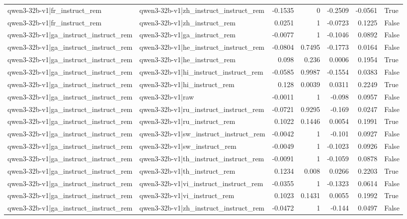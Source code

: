 \begin{table}
\begin{tabular}{l l r r r r l}
qwen3-32b-v1|fr_instruct_rem & qwen3-32b-v1|zh_instruct_instruct_rem & -0.1535 & 0 & -0.2509 & -0.0561 & True \\
qwen3-32b-v1|fr_instruct_rem & qwen3-32b-v1|zh_instruct_rem & 0.0251 & 1 & -0.0723 & 0.1225 & False \\
qwen3-32b-v1|ga_instruct_instruct_rem & qwen3-32b-v1|ga_instruct_rem & -0.0077 & 1 & -0.1046 & 0.0892 & False \\
qwen3-32b-v1|ga_instruct_instruct_rem & qwen3-32b-v1|he_instruct_instruct_rem & -0.0804 & 0.7495 & -0.1773 & 0.0164 & False \\
qwen3-32b-v1|ga_instruct_instruct_rem & qwen3-32b-v1|he_instruct_rem & 0.098 & 0.236 & 0.0006 & 0.1954 & True \\
qwen3-32b-v1|ga_instruct_instruct_rem & qwen3-32b-v1|hi_instruct_instruct_rem & -0.0585 & 0.9987 & -0.1554 & 0.0383 & False \\
qwen3-32b-v1|ga_instruct_instruct_rem & qwen3-32b-v1|hi_instruct_rem & 0.128 & 0.0039 & 0.0311 & 0.2249 & True \\
qwen3-32b-v1|ga_instruct_instruct_rem & qwen3-32b-v1|raw & -0.0011 & 1 & -0.098 & 0.0957 & False \\
qwen3-32b-v1|ga_instruct_instruct_rem & qwen3-32b-v1|ru_instruct_instruct_rem & -0.0721 & 0.9295 & -0.169 & 0.0247 & False \\
qwen3-32b-v1|ga_instruct_instruct_rem & qwen3-32b-v1|ru_instruct_rem & 0.1022 & 0.1446 & 0.0054 & 0.1991 & True \\
qwen3-32b-v1|ga_instruct_instruct_rem & qwen3-32b-v1|sw_instruct_instruct_rem & -0.0042 & 1 & -0.101 & 0.0927 & False \\
qwen3-32b-v1|ga_instruct_instruct_rem & qwen3-32b-v1|sw_instruct_rem & -0.0049 & 1 & -0.1023 & 0.0926 & False \\
qwen3-32b-v1|ga_instruct_instruct_rem & qwen3-32b-v1|th_instruct_instruct_rem & -0.0091 & 1 & -0.1059 & 0.0878 & False \\
qwen3-32b-v1|ga_instruct_instruct_rem & qwen3-32b-v1|th_instruct_rem & 0.1234 & 0.008 & 0.0266 & 0.2203 & True \\
qwen3-32b-v1|ga_instruct_instruct_rem & qwen3-32b-v1|vi_instruct_instruct_rem & -0.0355 & 1 & -0.1323 & 0.0614 & False \\
qwen3-32b-v1|ga_instruct_instruct_rem & qwen3-32b-v1|vi_instruct_rem & 0.1023 & 0.1431 & 0.0055 & 0.1992 & True \\
qwen3-32b-v1|ga_instruct_instruct_rem & qwen3-32b-v1|zh_instruct_instruct_rem & -0.0472 & 1 & -0.144 & 0.0497 & False \\

\end{tabular}
\end{table}
